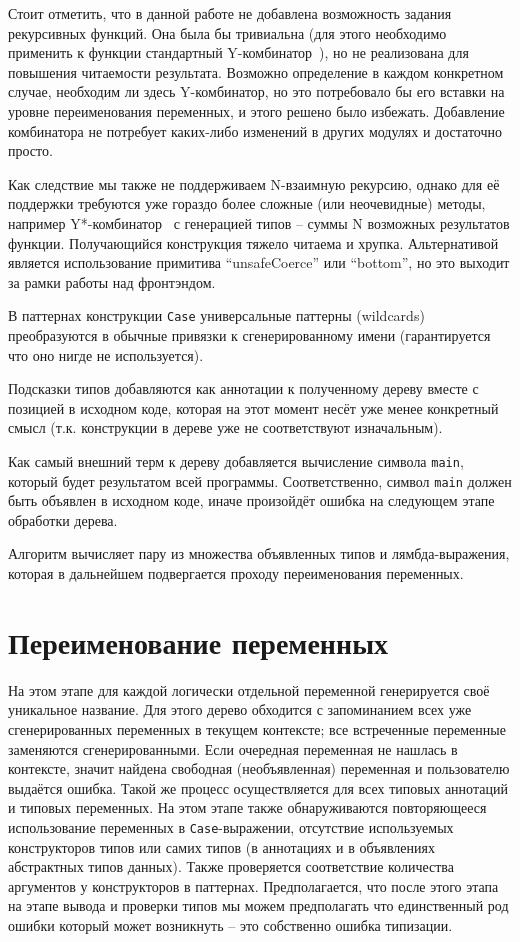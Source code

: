 \documentclass[a4paper,12pt]{article}
\begin{document}
Стоит отметить, что в данной работе не добавлена возможность задания рекурсивных
функций. Она была бы тривиальна (для этого необходимо применить к функции
стандартный Y-комбинатор~\cite{fixpoint}), но не реализована для повышения
читаемости результата. Возможно определение в каждом конкретном случае,
необходим ли здесь Y-комбинатор, но это потребовало бы его вставки на уровне
переименования переменных, и этого решено было избежать. Добавление комбинатора
не потребует каких-либо изменений в других модулях и достаточно просто.

Как следствие мы также не поддерживаем N-взаимную рекурсию, однако для её
поддержки требуются уже гораздо более сложные (или неочевидные) методы, например
Y*-комбинатор~\cite{oleg-ystar} с генерацией типов -- суммы N возможных
результатов функции. Получающийся конструкция тяжело читаема и
хрупка. Альтернативой является использование примитива ``unsafeCoerce'' или
``bottom'', но это выходит за рамки работы над фронтэндом.

В паттернах конструкции \texttt{Case} универсальные паттерны (wildcards)
преобразуются в обычные привязки к сгенерированному имени (гарантируется что оно
нигде не используется).

Подсказки типов добавляются как аннотации к полученному дереву вместе с позицией
в исходном коде, которая на этот момент несёт уже менее конкретный смысл
(т.к. конструкции в дереве уже не соответствуют изначальным).

Как самый внешний терм к дереву добавляется вычисление символа \texttt{main},
который будет результатом всей программы. Соответственно, символ \texttt{main}
должен быть объявлен в исходном коде, иначе произойдёт ошибка на следующем этапе
обработки дерева.

Алгоритм вычисляет пару из множества объявленных типов и лямбда-выражения, которая в
дальнейшем подвергается проходу переименования переменных.

\section{Переименование переменных}

На этом этапе для каждой логически отдельной переменной генерируется своё
уникальное название. Для этого дерево обходится с запоминанием всех уже
сгенерированных переменных в текущем контексте; все встреченные переменные
заменяются сгенерированными. Если очередная переменная не нашлась в контексте,
значит найдена свободная (необъявленная) переменная и пользователю выдаётся
ошибка. Такой же процесс осуществляется для всех типовых аннотаций и типовых
переменных. На этом этапе также обнаруживаются повторяющееся использование
переменных в \texttt{Case}-выражении, отсутствие используемых конструкторов
типов или самих типов (в аннотациях и в объявлениях абстрактных типов
данных). Также проверяется соответствие количества аргументов у конструкторов в
паттернах. Предполагается, что после этого этапа на этапе вывода и проверки
типов мы можем предполагать что единственный род ошибки который может возникнуть
-- это собственно ошибка типизации.
\end{document}
